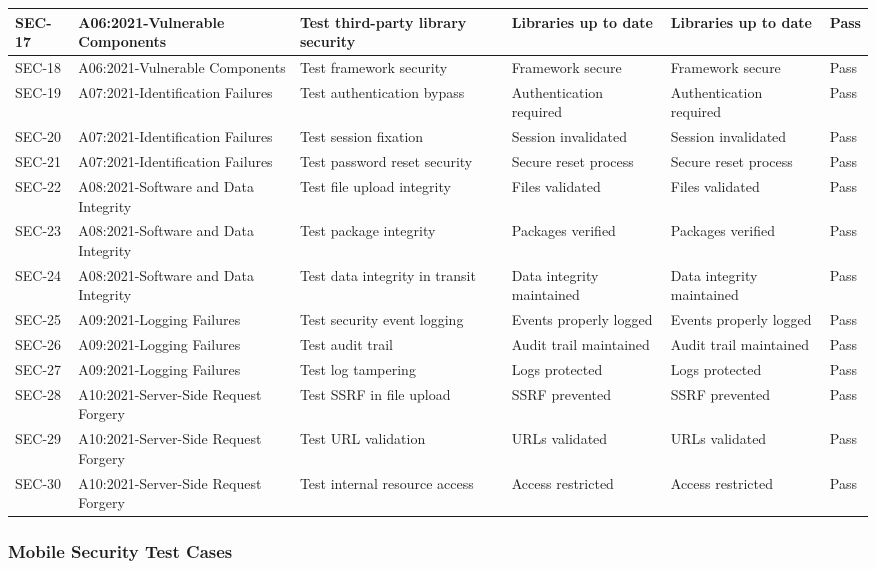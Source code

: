 {\begin{longtable}{|C{1.5cm}|C{2.5cm}|C{3cm}|C{2cm}|C{2cm}|C{1cm}|}
\hline
SEC-17 & A06:2021-Vulnerable Components & Test third-party library security & Libraries up to date & Libraries up to date & Pass \\
\hline
SEC-18 & A06:2021-Vulnerable Components & Test framework security & Framework secure & Framework secure & Pass \\
\hline
SEC-19 & A07:2021-Identification Failures & Test authentication bypass & Authentication required & Authentication required & Pass \\
\hline
SEC-20 & A07:2021-Identification Failures & Test session fixation & Session invalidated & Session invalidated & Pass \\
\hline
SEC-21 & A07:2021-Identification Failures & Test password reset security & Secure reset process & Secure reset process & Pass \\
\hline
SEC-22 & A08:2021-Software and Data Integrity & Test file upload integrity & Files validated & Files validated & Pass \\
\hline
SEC-23 & A08:2021-Software and Data Integrity & Test package integrity & Packages verified & Packages verified & Pass \\
\hline
SEC-24 & A08:2021-Software and Data Integrity & Test data integrity in transit & Data integrity maintained & Data integrity maintained & Pass \\
\hline
SEC-25 & A09:2021-Logging Failures & Test security event logging & Events properly logged & Events properly logged & Pass \\
\hline
SEC-26 & A09:2021-Logging Failures & Test audit trail & Audit trail maintained & Audit trail maintained & Pass \\
\hline
SEC-27 & A09:2021-Logging Failures & Test log tampering & Logs protected & Logs protected & Pass \\
\hline
SEC-28 & A10:2021-Server-Side Request Forgery & Test SSRF in file upload & SSRF prevented & SSRF prevented & Pass \\
\hline
SEC-29 & A10:2021-Server-Side Request Forgery & Test URL validation & URLs validated & URLs validated & Pass \\
\hline
SEC-30 & A10:2021-Server-Side Request Forgery & Test internal resource access & Access restricted & Access restricted & Pass \\
\hline
\end{longtable}
}

\subsubsection{Mobile Security Test Cases}

